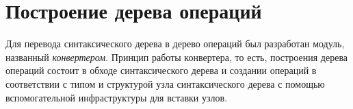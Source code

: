 \newpage
\section{Построение дерева операций}
\label{sec:converter}

Для перевода синтаксического дерева в дерево операций был разработан модуль, названный \textit{конвертером}.
Принцип работы конвертера, то есть, построения дерева операций состоит в обходе синтаксического дерева и создании операций в соответствии с типом и структурой узла синтаксического дерева с помощью вспомогательной инфраструктуры для вставки узлов.
